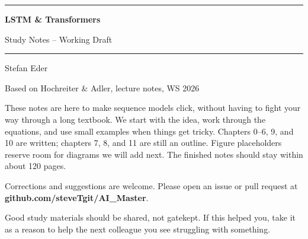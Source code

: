 \documentclass[11pt, oneside]{book}
\newcommand{\coursetitle}{LSTM \& Transformers}
\newcommand{\documenttype}{Study Notes -- Working Draft}
\newcommand{\authorname}{Stefan Eder}
\newcommand{\basedon}{Based on Hochreiter \& Adler, lecture notes, WS 2026}
\begin{document}
\frontmatter  %


\thispagestyle{empty}
\vspace*{1.8cm}

\begin{center}
  {\color{accent}\rule{\linewidth}{1.8pt}}
  \vspace{0.65cm}

  {\fontsize{28}{34}\selectfont\bfseries\color{accent}\coursetitle\par}
  \vspace{0.25cm}
  {\large\color{gray!80!black}\documenttype\par}

  \vspace{0.55cm}
  {\color{accent!35}\rule{\linewidth}{0.5pt}}
  \vspace{0.55cm}

  {\large\authorname\par}
  \vspace{0.2cm}
  {\small\color{gray!70}\basedon\par}
\end{center}

\vspace{1.6cm}

\begin{center}
\begin{minipage}{0.84\textwidth}
  \small\raggedright\color{gray!80!black}
  These notes are here to make sequence models click, without having to
  fight your way through a long textbook. We start with the idea, work
  through the equations, and use small examples when things get tricky.
  Chapters 0--6, 9, and 10 are written; chapters 7, 8, and 11 are still an outline.
  Figure placeholders reserve room for diagrams we will add next.
  The finished notes should stay within about 120 pages.

  \medskip
  Corrections and suggestions are welcome. Please open an issue or pull request at
  \textbf{github.com/steveTgit/AI\_Master}.

  \medskip
  \color{gray!60!black}
  Good study materials should be shared, not gatekept.
  If this helped you, take it as a reason to help the next colleague you see struggling with something.
\end{minipage}
\end{center}
\end{document}
